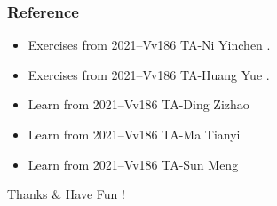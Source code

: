 \documentclass{beamer}
\begin{document}
\begin{frame}
    \frametitle{Reference}
    \begin{itemize}
        \item Exercises from 2021--Vv186 TA-Ni Yinchen .
        \item Exercises from 2021--Vv186 TA-Huang Yue .
        \item Learn from 2021--Vv186 TA-Ding Zizhao
        \item Learn from 2021--Vv186 TA-Ma Tianyi
        \item Learn from 2021--Vv186 TA-Sun Meng
    \end{itemize}
\end{frame}

\begin{frame}
    \begin{center}
        {\Huge Thanks $\&$ Have Fun !}
    \end{center}
\end{frame}
\end{document}
